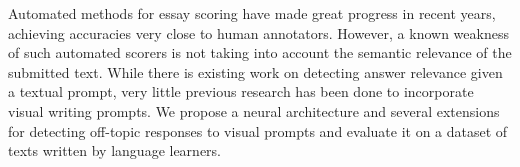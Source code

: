 Automated methods for essay scoring have made great progress in recent years, achieving accuracies very close to human annotators. However, a known weakness of such automated scorers is not taking into account the semantic relevance of the submitted text. While there is existing work on detecting answer relevance given a textual prompt, very little previous research has been done to incorporate visual writing prompts. We propose a neural architecture and several extensions for detecting off-topic responses to visual prompts and evaluate it on a dataset of texts written by language learners.
